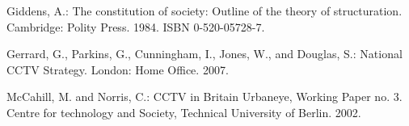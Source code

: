 \documentclass{llncs}
\begin{document}
\begin{thebibliography}{}
Giddens, A.:
The constitution of society: Outline of the theory of structuration. Cambridge: Polity Press. 1984. ISBN 0-520-05728-7.

Gerrard, G., Parkins, G., Cunningham, I., Jones, W., and Douglas, S.:
National CCTV Strategy. London: Home Office. 2007.

McCahill, M. and Norris, C.:
CCTV in Britain Urbaneye, Working Paper no. 3. Centre for technology and Society, Technical University of Berlin. 2002.

\end{thebibliography}
\end{document}
